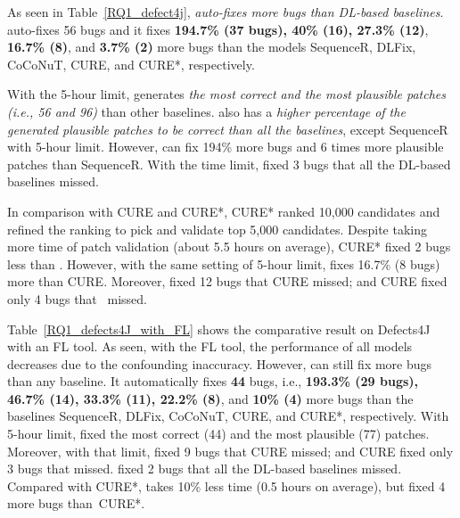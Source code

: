 As seen in Table~\ref{RQ1_defect4j}, {\em {\tool} auto-fixes more
  bugs than DL-based baselines}. {\tool} auto-fixes 56 bugs and it
fixes {\bf 194.7\% (37 bugs), 40\% (16), 27.3\% (12)}, {\bf 16.7\%
  (8)}, and {\bf 3.7\% (2)} more bugs than the models
SequenceR, DLFix, CoCoNuT, CURE, and CURE*, respectively.

With the 5-hour limit, {\tool} generates {\em the most correct and the
  most plausible patches (i.e., 56 and 96)} than other baselines.
{\tool} also has a {\em higher percentage of the generated plausible
  patches to be correct than all the baselines}, except SequenceR with
5-hour limit. However, {\tool} can fix 194\% more bugs and 6 times
more plausible patches than SequenceR. With the time limit, {\tool}
fixed 3 bugs that all the DL-based baselines missed.

In comparison with CURE and CURE*, CURE* ranked 10,000 candidates and
refined the ranking to pick and validate top 5,000 candidates. Despite
taking more time of patch validation (about 5.5 hours on average),
CURE* fixed 2 bugs less than {\tool}. However, with the same setting
of 5-hour limit, {\tool} fixes 16.7\% (8 bugs) more than
CURE. Moreover, {\tool} fixed 12 bugs that CURE missed; and CURE fixed
only 4 bugs that {\tool}~missed.




Table~\ref{RQ1_defects4J_with_FL} shows the comparative result on
Defects4J with an FL tool. As seen, with the FL tool, the performance
of all models decreases due to the confounding inaccuracy. However,
{\tool} can still fix more bugs than any baseline. It automatically
fixes {\bf 44} bugs, i.e., {\bf 193.3\% (29 bugs), 46.7\% (14), 33.3\%
  (11), 22.2\% (8)}, and {\bf 10\% (4)} more bugs than the baselines
SequenceR, DLFix, CoCoNuT, CURE, and CURE*, respectively. With 5-hour
limit, {\tool} fixed the most correct (44) and the most plausible (77)
patches. Moreover, with that limit, {\tool} fixed 9 bugs that
CURE missed; and CURE fixed only 3 bugs that {\tool}
missed. {\tool} fixed 2 bugs that all the DL-based baselines
missed. Compared with CURE*, {\tool} takes 10\% less time (0.5 hours
on average), but fixed 4 more bugs than~CURE*.


